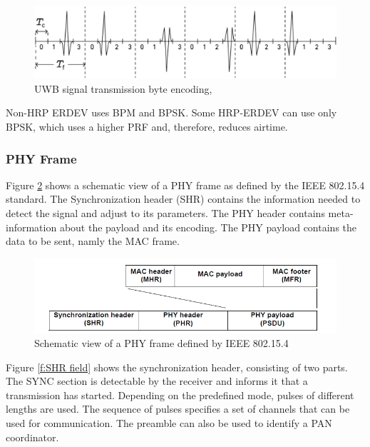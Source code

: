 \begin{figure}[ht!]
	\centering
	\includegraphics[width=\linewidth]{graphics/uwb_signal_tramsmission.png}
	\caption{UWB signal transmission byte encoding, \cite{QorvoGettingBacktoBasics}}
	\label{f:UWB_signal_description}
\end{figure}

Non-HRP ERDEV uses BPM and BPSK.
Some HRP-ERDEV can use only BPSK, which uses a higher PRF and, therefore, reduces airtime.








\subsubsection{PHY Frame}
Figure \ref{f:PPDU general} shows a schematic view of a PHY frame as defined by the IEEE 802.15.4 standard.
The Synchronization header (SHR) contains the information needed to detect the signal and adjust to its parameters.
The PHY header contains meta-information about the payload and its encoding.
The PHY payload contains the data to be sent, namly the MAC frame.

\begin{figure}[!ht]
\centering
\includegraphics[width=\linewidth]{graphics/Schematic_view_PPDU.png}
\caption{Schematic view of a PHY frame defined by IEEE 802.15.4 \cite{IEEE4-2020-7}}
\label{f:PPDU general}
\end{figure}


Figure \ref{f:SHR field} shows the synchronization header, consisting of two parts.
The SYNC section is detectable by the receiver and informs it that a transmission has started.
Depending on the predefined mode, pulses of different lengths are used.
The sequence of pulses specifies a set of channels that can be used for communication.
The preamble can also be used to identify a PAN coordinator.

